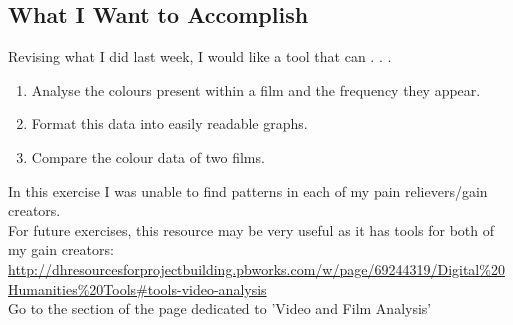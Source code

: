 \documentclass{article}
\begin{document}
\subsection*{What I Want to Accomplish}
Revising what I did last week, I would like a tool that can . . .
\begin{enumerate}
\item Analyse the colours present within a film and the frequency they appear.
\item Format this data into easily readable graphs.
\item Compare the colour data of two films.
\end{enumerate}

In this exercise I was unable to find patterns in each of my pain relievers/gain creators.\\
For future exercises, this resource may be very useful as it has tools for both of my gain creators: \url{http://dhresourcesforprojectbuilding.pbworks.com/w/page/69244319/Digital%20Humanities%20Tools#tools-video-analysis}
\\Go to the section of the page dedicated to 'Video and Film Analysis'
\end{document}
